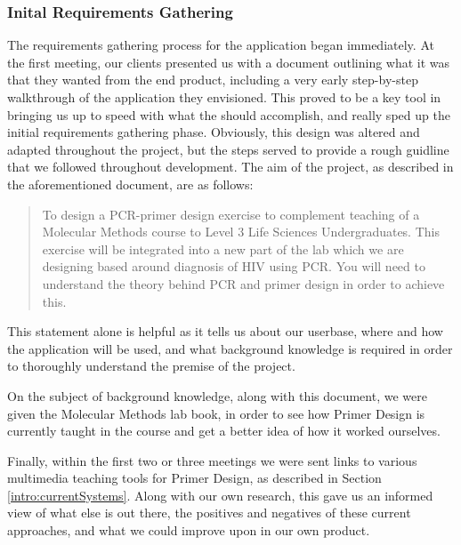 
\subsubsection{Inital Requirements Gathering}
The requirements gathering process for the application began immediately.
At the first meeting, our clients presented us with a document outlining
what it was that they wanted from the end product, including a very
early step-by-step walkthrough of the application they envisioned. This
proved to be a key tool in bringing us up to speed with what the %
should accomplish, and really sped up the initial requirements gathering
phase. Obviously, this design was altered and adapted throughout the
project, but the steps served to provide a rough guidline that we
followed throughout development. The aim of the project, as described in
the aforementioned document, are as follows:
\begin{quotation}
To design a PCR-primer design exercise to complement teaching of a
Molecular Methods course to Level 3 Life Sciences Undergraduates. This
exercise will be integrated into a new part of the lab which we are
designing based around diagnosis of HIV using PCR. You will need to
understand the theory behind PCR and primer design in order to achieve
this.
\end{quotation}
This statement alone is helpful as it tells us about our userbase, where
and how the application will be used, and what background knowledge is
required in order to thoroughly understand the premise of the project.

On the subject of background knowledge, along with this document, we 
were given the Molecular Methods lab book, in order to see how Primer 
Design is currently taught in the course and get a better idea of how
it worked ourselves.

Finally, within the first two or three meetings we were sent links to
various multimedia teaching tools for Primer Design, as described in
Section \ref{intro:currentSystems}. Along with our own research, this
gave us an informed view of what else is out there, the positives and
negatives of these current approaches, and what we could improve upon
in our own product.

